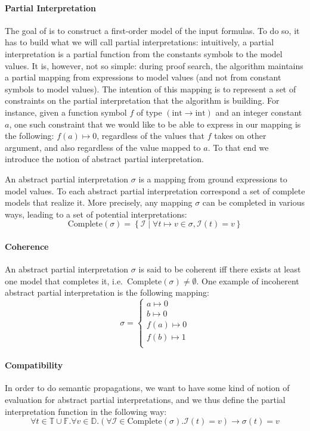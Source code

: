 \documentclass{article}
\begin{document}
\paragraph{Partial Interpretation}
The goal of \mcsat{} is to construct a first-order model of the input formulas. To do so,
it has to build what we will call partial interpretations: intuitively, a partial
interpretation is a partial function from the constants symbols to the model values.
It is, however, not so simple: during proof search, the \mcsat{} algorithm maintains
a partial mapping from expressions to model values (and not from constant symbols
to model values). The intention of this mapping is to represent a set of constraints
on the partial interpretation that the algorithm is building.
For instance, given a function symbol $f$ of type $(\text{int} \rightarrow \text{int})$ and an
integer constant $a$, one such constraint that we would like to be able to express in
our mapping is the following: $f(a) \mapsto 0$, regardless of the values that $f$ takes on
other argument, and also regardless of the value mapped to $a$. To that end we introduce
the notion of abstract partial interpretation.

An abstract partial interpretation $\sigma$ is a mapping from ground expressions to model values.
To each abstract partial interpretation correspond a set of complete models that realize it.
More precisely, any mapping $\sigma$ can be completed in various ways, leading to a set of
potential interpretations:
\[
  \text{Complete}(\sigma) =
    \left\{
      \mathcal{I}
      \; | \;
      \forall t \mapsto v \in \sigma , \mathcal{I} ( t ) = v
    \right\}
\]

\paragraph{Coherence}
An abstract partial interpretation $\sigma$ is said to be coherent iff
there exists at least one model that completes it,
i.e.~$\text{Complete}(\sigma) \neq \emptyset$. One example
of incoherent abstract partial interpretation is the following
mapping:
\[
  \sigma = \left\{
    \begin{matrix}
      a \mapsto 0 \\
      b \mapsto 0 \\
      f(a) \mapsto 0 \\
      f(b) \mapsto 1 \\
    \end{matrix}
  \right.
\]

\paragraph{Compatibility}
In order to do semantic propagations, we want to have some kind of notion
of evaluation for abstract partial interpretations, and we thus define the
partial interpretation function in the following way:
\[
  \forall t \in \mathbb{T} \cup \mathbb{F}. \forall v \in \mathbb{D}.
  \left(
    \forall \mathcal{I} \in \text{Complete}(\sigma).
    \mathcal{I}(t) = v
  \right) \rightarrow
    \sigma(t) = v
\]
\end{document}
